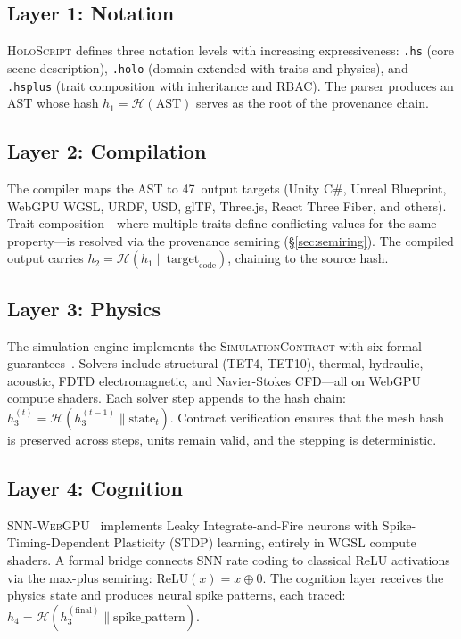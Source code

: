 \documentclass[sigchi-a]{acmart}
\newcommand{\holoscript}{\textsc{HoloScript}}
\newcommand{\simcontract}{\textsc{SimulationContract}}
\newcommand{\snnwebgpu}{\textsc{SNN-WebGPU}}
\newcommand{\tropplus}{\oplus}
\newcommand{\hashfn}{\mathcal{H}}
\begin{document}
\subsection{Layer 1: Notation}

\holoscript{} defines three notation levels with increasing expressiveness:
\texttt{.hs} (core scene description), \texttt{.holo} (domain-extended with
traits and physics), and \texttt{.hsplus} (trait composition with inheritance
and RBAC). The parser produces an AST whose hash $h_1 = \hashfn(\text{AST})$
serves as the root of the provenance chain.

\subsection{Layer 2: Compilation}

The compiler maps the AST to 47~output targets (Unity C\#, Unreal Blueprint,
WebGPU WGSL, URDF, USD, glTF, Three.js, React Three Fiber, and others).
Trait composition---where multiple traits define conflicting values for the
same property---is resolved via the provenance semiring (\S\ref{sec:semiring}).
The compiled output carries $h_2 = \hashfn(h_1 \| \text{target}_{\text{code}})$,
chaining to the source hash.

\subsection{Layer 3: Physics}

The simulation engine implements the \simcontract{} with six formal
guarantees~\cite{trustbyconstruction2026}. Solvers include structural (TET4,
TET10), thermal, hydraulic, acoustic, FDTD electromagnetic, and Navier-Stokes
CFD---all on WebGPU compute shaders. Each solver step appends to the hash
chain: $h_3^{(t)} = \hashfn(h_3^{(t-1)} \| \text{state}_t)$. Contract
verification ensures that the mesh hash is preserved across steps, units
remain valid, and the stepping is deterministic.

\subsection{Layer 4: Cognition}

\snnwebgpu{}~\cite{snn-paper} implements Leaky Integrate-and-Fire neurons
with Spike-Timing-Dependent Plasticity (STDP) learning, entirely in WGSL
compute shaders. A formal bridge connects SNN rate coding to classical
ReLU activations via the max-plus semiring:
$\text{ReLU}(x) = x \tropplus 0$. The cognition layer receives the physics
state and produces neural spike patterns, each traced:
$h_4 = \hashfn(h_3^{(\text{final})} \| \text{spike\_pattern})$.
\end{document}
